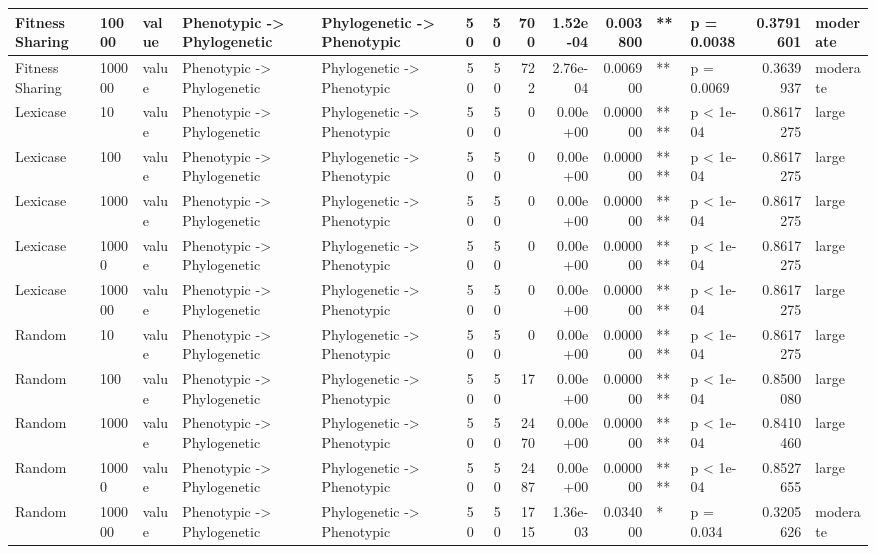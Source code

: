 \documentclass[]{book}
\begin{document}
\begin{table}
\begin{tabular}[t]{l|l|l|l|l|r|r|r|r|r|l|l|r|l}
\hline
Fitness Sharing & 10000 & value & Phenotypic
    ->
Phylogenetic & Phylogenetic
    ->
Phenotypic & 50 & 50 & 700 & 1.52e-04 & 0.003800 & ** & p = 0.0038 & 0.3791601 & moderate\\
\hline
Fitness Sharing & 100000 & value & Phenotypic
    ->
Phylogenetic & Phylogenetic
    ->
Phenotypic & 50 & 50 & 722 & 2.76e-04 & 0.006900 & ** & p = 0.0069 & 0.3639937 & moderate\\
\hline
Lexicase & 10 & value & Phenotypic
    ->
Phylogenetic & Phylogenetic
    ->
Phenotypic & 50 & 50 & 0 & 0.00e+00 & 0.000000 & **** & p < 1e-04 & 0.8617275 & large\\
\hline
Lexicase & 100 & value & Phenotypic
    ->
Phylogenetic & Phylogenetic
    ->
Phenotypic & 50 & 50 & 0 & 0.00e+00 & 0.000000 & **** & p < 1e-04 & 0.8617275 & large\\
\hline
Lexicase & 1000 & value & Phenotypic
    ->
Phylogenetic & Phylogenetic
    ->
Phenotypic & 50 & 50 & 0 & 0.00e+00 & 0.000000 & **** & p < 1e-04 & 0.8617275 & large\\
\hline
Lexicase & 10000 & value & Phenotypic
    ->
Phylogenetic & Phylogenetic
    ->
Phenotypic & 50 & 50 & 0 & 0.00e+00 & 0.000000 & **** & p < 1e-04 & 0.8617275 & large\\
\hline
Lexicase & 100000 & value & Phenotypic
    ->
Phylogenetic & Phylogenetic
    ->
Phenotypic & 50 & 50 & 0 & 0.00e+00 & 0.000000 & **** & p < 1e-04 & 0.8617275 & large\\
\hline
Random & 10 & value & Phenotypic
    ->
Phylogenetic & Phylogenetic
    ->
Phenotypic & 50 & 50 & 0 & 0.00e+00 & 0.000000 & **** & p < 1e-04 & 0.8617275 & large\\
\hline
Random & 100 & value & Phenotypic
    ->
Phylogenetic & Phylogenetic
    ->
Phenotypic & 50 & 50 & 17 & 0.00e+00 & 0.000000 & **** & p < 1e-04 & 0.8500080 & large\\
\hline
Random & 1000 & value & Phenotypic
    ->
Phylogenetic & Phylogenetic
    ->
Phenotypic & 50 & 50 & 2470 & 0.00e+00 & 0.000000 & **** & p < 1e-04 & 0.8410460 & large\\
\hline
Random & 10000 & value & Phenotypic
    ->
Phylogenetic & Phylogenetic
    ->
Phenotypic & 50 & 50 & 2487 & 0.00e+00 & 0.000000 & **** & p < 1e-04 & 0.8527655 & large\\
\hline
Random & 100000 & value & Phenotypic
    ->
Phylogenetic & Phylogenetic
    ->
Phenotypic & 50 & 50 & 1715 & 1.36e-03 & 0.034000 & * & p = 0.034 & 0.3205626 & moderate\\
\hline

\end{tabular}
\end{table}
\end{document}
